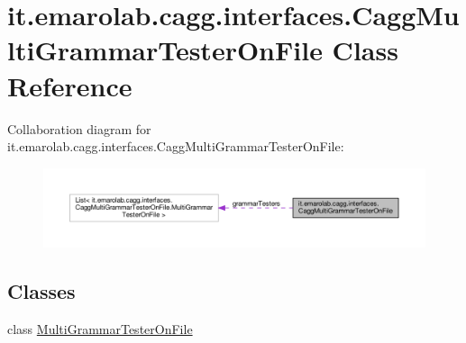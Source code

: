 \hypertarget{classit_1_1emarolab_1_1cagg_1_1interfaces_1_1CaggMultiGrammarTesterOnFile}{\section{it.\-emarolab.\-cagg.\-interfaces.\-Cagg\-Multi\-Grammar\-Tester\-On\-File Class Reference}
\label{classit_1_1emarolab_1_1cagg_1_1interfaces_1_1CaggMultiGrammarTesterOnFile}
}


Collaboration diagram for it.\-emarolab.\-cagg.\-interfaces.\-Cagg\-Multi\-Grammar\-Tester\-On\-File\-:\nopagebreak
\begin{figure}[H]
\begin{center}
\leavevmode
\includegraphics[width=350pt]{classit_1_1emarolab_1_1cagg_1_1interfaces_1_1CaggMultiGrammarTesterOnFile__coll__graph}
\end{center}
\end{figure}
\subsection*{Classes}
\begin{DoxyCompactItemize}
\item 
class \hyperlink{classit_1_1emarolab_1_1cagg_1_1interfaces_1_1CaggMultiGrammarTesterOnFile_1_1MultiGrammarTesterOnFile}{Multi\-Grammar\-Tester\-On\-File}
\end{DoxyCompactItemize}
